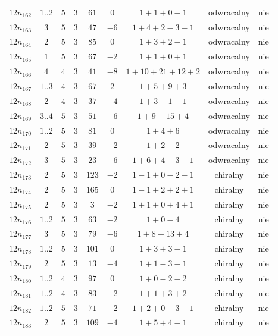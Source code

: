 \begin{longtable}{ccccccccc}
$12n_{162}$ & $1..2$ & $5$ & $3$ & $61$ & $0$ & $1+1+0-1$ & odwracalny & nie \\
$12n_{163}$ & $3$ & $5$ & $3$ & $47$ & $-6$ & $1+4+2-3-1$ & odwracalny & nie \\
$12n_{164}$ & $2$ & $5$ & $3$ & $85$ & $0$ & $1+3+2-1$ & odwracalny & nie \\
$12n_{165}$ & $1$ & $5$ & $3$ & $67$ & $-2$ & $1+1+0+1$ & odwracalny & nie \\
$12n_{166}$ & $4$ & $4$ & $3$ & $41$ & $-8$ & $1+10+21+12+2$ & odwracalny & nie \\
$12n_{167}$ & $1..3$ & $4$ & $3$ & $67$ & $2$ & $1+5+9+3$ & odwracalny & nie \\
$12n_{168}$ & $2$ & $4$ & $3$ & $37$ & $-4$ & $1+3-1-1$ & odwracalny & nie \\
$12n_{169}$ & $3..4$ & $5$ & $3$ & $51$ & $-6$ & $1+9+15+4$ & odwracalny & nie \\
$12n_{170}$ & $1..2$ & $5$ & $3$ & $81$ & $0$ & $1+4+6$ & odwracalny & nie \\
$12n_{171}$ & $2$ & $5$ & $3$ & $39$ & $-2$ & $1+2-2$ & odwracalny & nie \\
$12n_{172}$ & $3$ & $5$ & $3$ & $23$ & $-6$ & $1+6+4-3-1$ & odwracalny & nie \\
$12n_{173}$ & $2$ & $5$ & $3$ & $123$ & $-2$ & $1-1+0-2-1$ & chiralny & nie \\
$12n_{174}$ & $2$ & $5$ & $3$ & $165$ & $0$ & $1-1+2+2+1$ & chiralny & nie \\
$12n_{175}$ & $2$ & $5$ & $3$ & $3$ & $-2$ & $1+1+0+4+1$ & chiralny & nie \\
$12n_{176}$ & $1..2$ & $5$ & $3$ & $63$ & $-2$ & $1+0-4$ & chiralny & nie \\
$12n_{177}$ & $3$ & $5$ & $3$ & $79$ & $-6$ & $1+8+13+4$ & chiralny & nie \\
$12n_{178}$ & $1..2$ & $5$ & $3$ & $101$ & $0$ & $1+3+3-1$ & chiralny & nie \\
$12n_{179}$ & $2$ & $5$ & $3$ & $13$ & $-4$ & $1+1-3-1$ & chiralny & nie \\
$12n_{180}$ & $1..2$ & $4$ & $3$ & $97$ & $0$ & $1+0-2-2$ & chiralny & nie \\
$12n_{181}$ & $1..2$ & $4$ & $3$ & $83$ & $-2$ & $1+1+3+2$ & chiralny & nie \\
$12n_{182}$ & $1..2$ & $5$ & $3$ & $71$ & $-2$ & $1+2+0-3-1$ & chiralny & nie \\
$12n_{183}$ & $2$ & $5$ & $3$ & $109$ & $-4$ & $1+5+4-1$ & chiralny & nie \\

\end{longtable}
